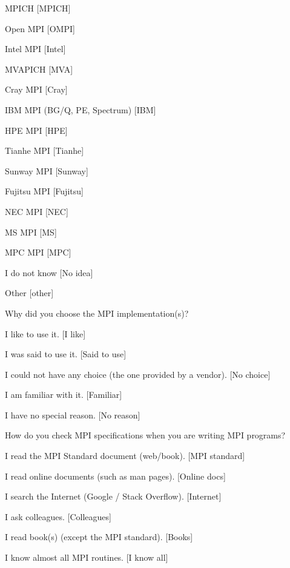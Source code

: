 \documentclass[preprint,5p,times]{elsarticle}
\begin{document}
{\begin{description}
    \begin{inparaenum}[{\bf C}1)]
    \item MPICH [MPICH]
    \item Open MPI [OMPI]
    \item Intel MPI [Intel]
    \item MVAPICH [MVA]
    \item Cray MPI [Cray]
    \item IBM MPI (BG/Q, PE, Spectrum) [IBM]
    \item HPE MPI [HPE]
    \item Tianhe MPI [Tianhe]
    \item Sunway MPI [Sunway]
    \item Fujitsu MPI [Fujitsu]
    \item NEC MPI [NEC]
    \item MS MPI [MS]
    \item MPC MPI [MPC]
    \item I do not know [No idea]
    \item Other [other]
    \end{inparaenum}
  \item[Q13:] Why did you choose the MPI implementation(s)?
    \begin{inparaenum}[{\bf C}1)]
    \item I like to use it. [I like]
    \item I was said to use it. [Said to use]
    \item I could not have any choice (the one provided by a vendor). [No choice]
    \item I am familiar with it. [Familiar]
    \item I have no special reason. [No reason]
    \end{inparaenum}
  \item[Q14*:] How do you check MPI specifications when you are writing MPI programs?
    \begin{inparaenum}[{\bf C}1)]
    \item I read the MPI Standard document (web/book). [MPI standard]
    \item I read online documents (such as man pages). [Online docs]
    \item I search the Internet (Google / Stack Overflow). [Internet]
    \item I ask colleagues. [Colleagues]
    \item I read book(s) (except the MPI standard). [Books]
    \item I know almost all MPI routines. [I know all]

\end{inparaenum}
\end{description}}
\end{document}
